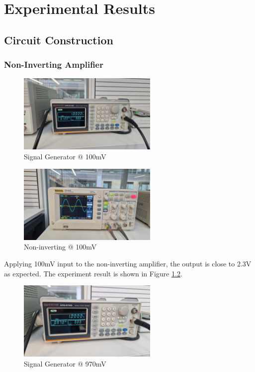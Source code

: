 \chapter{Experimental Results}

\section{Circuit Construction}

\subsection{Non-Inverting Amplifier}

\begin{figure}[h]
    \centering
    \includegraphics[width=0.6\textwidth]{assets/non-inverting-100m.jpg}
    \caption{Signal Generator @ 100mV}
    \label{fig:non-inverting-100m}
\end{figure}

\begin{figure}[h]
    \centering
    \includegraphics[width=0.6\textwidth]{assets/non-inverting-100m-output.jpg}
    \caption{Non-inverting @ 100mV}
    \label{fig:non-inverting-100m-output}
\end{figure}

Applying 100mV input to the non-inverting amplifier, the output is close to 2.3V as expected. The experiment result is shown in Figure \ref{fig:non-inverting-100m-output}. 

\newpage
\thispagestyle{plain}

\begin{figure}[h]
    \centering
    \includegraphics[width=0.6\textwidth]{assets/non-inverting-970m.jpg}
    \caption{Signal Generator @ 970mV}
    \label{fig:non-inverting-970m}
\end{figure}

